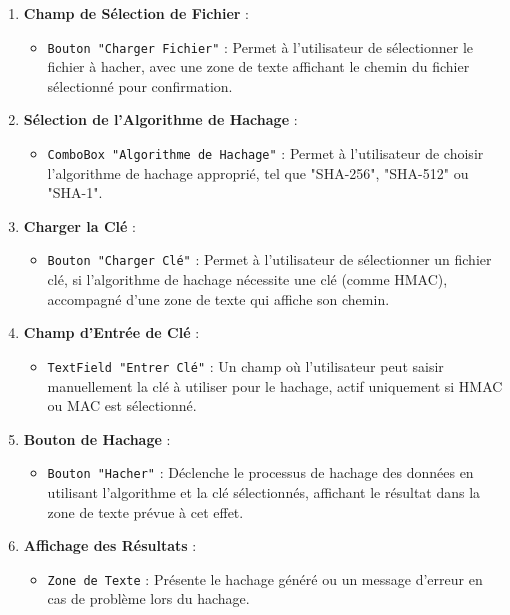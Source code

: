 \documentclass[a4paper,12pt]{report}
\begin{document}
 \begin{enumerate}
 
 	
 	\item \textbf{Champ de Sélection de Fichier} : 
 	\begin{itemize}
 		\item \texttt{Bouton "Charger Fichier"} : Permet à l'utilisateur de sélectionner le fichier à hacher, avec une zone de texte affichant le chemin du fichier sélectionné pour confirmation.
 	\end{itemize}
 	
 	\item \textbf{Sélection de l'Algorithme de Hachage} : 
 	\begin{itemize}
 		\item \texttt{ComboBox "Algorithme de Hachage"} : Permet à l'utilisateur de choisir l'algorithme de hachage approprié, tel que "SHA-256", "SHA-512" ou "SHA-1".
 	\end{itemize}
 	
 	\item \textbf{Charger la Clé} : 
 	\begin{itemize}
 		\item \texttt{Bouton "Charger Clé"} : Permet à l'utilisateur de sélectionner un fichier clé, si l'algorithme de hachage nécessite une clé (comme HMAC), accompagné d'une zone de texte qui affiche son chemin.
 	\end{itemize}
 	
 	\item \textbf{Champ d'Entrée de Clé} : 
 	\begin{itemize}
 		\item \texttt{TextField "Entrer Clé"} : Un champ où l'utilisateur peut saisir manuellement la clé à utiliser pour le hachage, actif uniquement si HMAC ou MAC est sélectionné.
 	\end{itemize}
 	
 	\item \textbf{Bouton de Hachage} : 
 	\begin{itemize}
 		\item \texttt{Bouton "Hacher"} : Déclenche le processus de hachage des données en utilisant l'algorithme et la clé sélectionnés, affichant le résultat dans la zone de texte prévue à cet effet.
 	\end{itemize}
 	
 	\item \textbf{Affichage des Résultats} : 
 	\begin{itemize}
 		\item \texttt{Zone de Texte} : Présente le hachage généré ou un message d'erreur en cas de problème lors du hachage.
 	\end{itemize}
 \end{enumerate}
 
\end{document}
